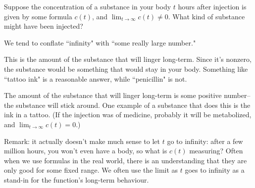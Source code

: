 \begin{question}Suppose the concentration of a substance in your body $t$ hours after injection is given by some formula $c(t)$, and $\displaystyle\lim_{t \rightarrow \infty} c(t) \neq 0$. What kind of substance might have been injected?
\end{question}
\begin{hint} We tend to conflate ``infinity" with ``some really large number."
\end{hint}
\begin{answer} This is the amount of the substance that will linger long-term. Since it's nonzero, the substance would be something that would stay in your body. Something like ``tattoo ink" is a reasonable answer, while ``penicillin" is not.
\end{answer}
\begin{solution}
The amount of the substance that will linger long-term is some positive number--the substance will stick around. One example of a substance that does this is the ink in a tattoo. (If the injection was of medicine, probably it will be metabolized, and $\displaystyle\lim_{t \rightarrow \infty} c(t)=0$.)

Remark: it actually doesn't make much sense to let $t$ go to infinity: after a few million hours,  you won't even have a body, so what is $c(t)$ measuring? Often when we use formulas in the real world, there is an understanding that they are only good for some fixed range. We often use the limit as $t$ goes to infinity as a stand-in for the function's long-term behaviour.
\end{solution}
